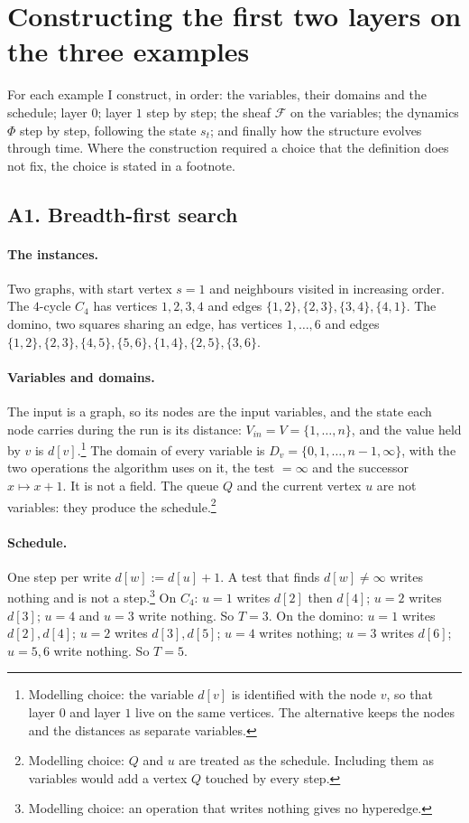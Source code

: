 \documentclass[11pt]{article}
\begin{document}
\section{Constructing the first two layers on the three examples}

For each example I construct, in order: the variables, their domains and the schedule; layer $0$; layer $1$ step by step; the sheaf $\mathcal{F}$ on the variables; the dynamics $\Phi$ step by step, following the state $s_t$; and finally how the structure evolves through time. Where the construction required a choice that the definition does not fix, the choice is stated in a footnote.

\subsection{A1. Breadth-first search}

\paragraph{The instances.} Two graphs, with start vertex $s=1$ and neighbours visited in increasing order. The $4$-cycle $C_4$ has vertices $1,2,3,4$ and edges $\{1,2\},\{2,3\},\{3,4\},\{4,1\}$. The domino, two squares sharing an edge, has vertices $1,\dots,6$ and edges $\{1,2\},\{2,3\},\{4,5\},\{5,6\},\{1,4\},\{2,5\},\{3,6\}$.

\paragraph{Variables and domains.} The input is a graph, so its nodes are the input variables, and the state each node carries during the run is its distance: $V_{in}=V=\{1,\dots,n\}$, and the value held by $v$ is $d[v]$.\footnote{Modelling choice: the variable $d[v]$ is identified with the node $v$, so that layer $0$ and layer $1$ live on the same vertices. The alternative keeps the nodes and the distances as separate variables.} The domain of every variable is $D_v=\{0,1,\dots,n-1,\infty\}$, with the two operations the algorithm uses on it, the test $=\infty$ and the successor $x\mapsto x+1$. It is not a field. The queue $Q$ and the current vertex $u$ are not variables: they produce the schedule.\footnote{Modelling choice: $Q$ and $u$ are treated as the schedule. Including them as variables would add a vertex $Q$ touched by every step.}

\paragraph{Schedule.} One step per write $d[w]:=d[u]+1$. A test that finds $d[w]\neq\infty$ writes nothing and is not a step.\footnote{Modelling choice: an operation that writes nothing gives no hyperedge.} On $C_4$: $u=1$ writes $d[2]$ then $d[4]$; $u=2$ writes $d[3]$; $u=4$ and $u=3$ write nothing. So $T=3$. On the domino: $u=1$ writes $d[2],d[4]$; $u=2$ writes $d[3],d[5]$; $u=4$ writes nothing; $u=3$ writes $d[6]$; $u=5,6$ write nothing. So $T=5$.
\end{document}
